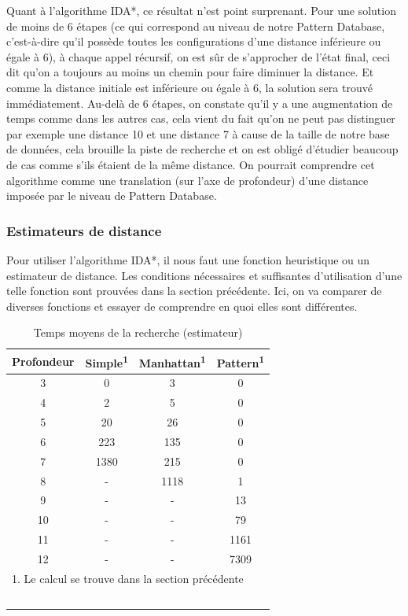 \documentclass[fleqn,10pt,french]{SelfArx} %
\begin{document}
Quant à l’algorithme IDA*, ce résultat n’est point surprenant. Pour une solution de moins de 6 étapes (ce qui correspond au niveau de notre Pattern Database, c’est-à-dire qu’il possède toutes les configurations d’une distance inférieure ou égale à 6), à chaque appel récursif, on est sûr de s’approcher de l’état final, ceci dit qu’on a toujours au moins un chemin pour faire diminuer la distance. Et comme la distance initiale est inférieure ou égale à 6, la solution sera trouvé immédiatement. Au-delà de 6 étapes, on constate qu’il y a une augmentation de temps comme dans les autres cas, cela vient du fait qu’on ne peut pas distinguer par exemple une distance 10 et une distance 7 à cause de la taille de notre base de données, cela brouille la piste de recherche et on est obligé d’étudier beaucoup de cas comme s’ils étaient de la même distance. On pourrait comprendre cet algorithme comme une translation (sur l’axe de profondeur) d’une distance imposée par le niveau de Pattern Database.

\subsubsection{Estimateurs de distance} 

Pour utiliser l’algorithme IDA*, il nous faut une fonction heuristique ou un estimateur de distance. Les conditions nécessaires et suffisantes d’utilisation d’une telle fonction sont prouvées dans la section précédente. Ici, on va comparer de diverses fonctions et essayer de comprendre en quoi elles sont différentes. 

\begin{table}[htbp]
\centering
\begin{tabular}{cccc}
\hline
\rowcolor{blue!20} \rule{0pt}{12pt} \textbf{Profondeur} & \textbf{Simple\textsuperscript{1} } & \textbf{Manhattan}\textsuperscript{1} & \textbf{Pattern\textsuperscript{1}}\\
\hline
3 & 0 & 3 & 0 \\
4 & 2 & 5 & 0 \\
5 & 20 & 26 & 0 \\
6 & 223 & 135 & 0  \\
7 & 1380 & 215 & 0 \\
8 & - & 1118 & 1 \\
9 & - & - & 13 \\
10 & - & - & 79 \\
11 & - & - & 1161 \\
12 & - & - & 7309 \\
\hline
\multicolumn{4}{l}{\small{1. Le calcul se trouve dans la section précédente}} \\
\hline
~\\
\end{tabular}
\caption{Temps moyens de la recherche (estimateur)}
\end{table}
\end{document}
